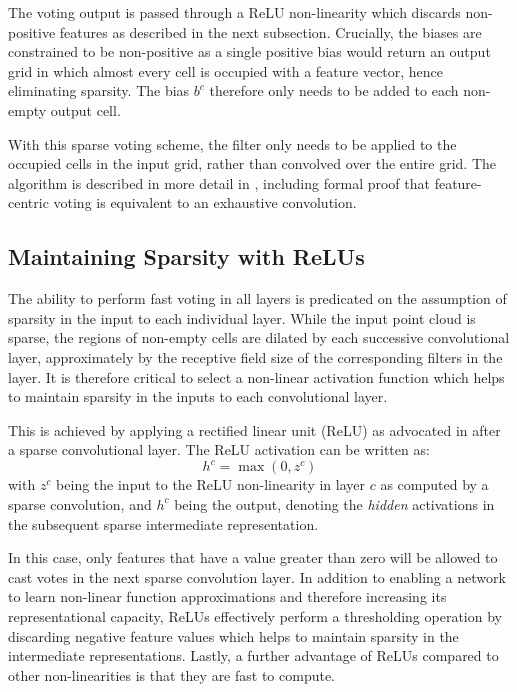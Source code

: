 \documentclass[letterpaper, 10 pt, conference]{tex_style/ieeeconf}
\begin{document}
The voting output is passed through a ReLU non-linearity which discards non-positive features as described in the next subsection.
Crucially, the biases are constrained to be non-positive as a single positive bias would return an output grid in which almost every cell is occupied with a feature vector, hence eliminating sparsity.
The bias $b^{c}$ therefore only needs to be added to each non-empty output cell.

With this sparse voting scheme, the filter only needs to be applied to the occupied cells in the input grid, rather than convolved over the entire grid.
The algorithm is described in more detail in \cite{wang2015voting}, including formal proof that feature-centric voting is equivalent to an exhaustive convolution.

\subsection{Maintaining Sparsity with ReLUs}
The ability to perform fast voting in all layers is predicated on the assumption of sparsity in the input to each individual layer.
While the input point cloud is sparse, the regions of non-empty cells are dilated by each successive convolutional layer, approximately by the receptive field size of the corresponding  filters in the layer.
It is therefore critical to select a non-linear activation function which helps to maintain sparsity in the inputs to each convolutional layer.

This is achieved by applying a rectified linear unit (ReLU) as advocated in \cite{glorot2011deep} after a sparse convolutional layer.
The ReLU activation can be written as:
 \begin{equation}
     h^{c} = \max \left(0, z^{c}\right)
 \end{equation}
 with $z^{c}$ being the input to the ReLU non-linearity in layer $c$ as computed by a sparse convolution, and $h^{c}$ being the output, denoting the \emph{hidden} activations in the subsequent sparse intermediate representation.

In this case, only features that have a value greater than zero will be allowed to cast votes in the next sparse convolution layer.
In addition to enabling a network to learn non-linear function approximations and therefore increasing its representational capacity, ReLUs effectively perform a thresholding operation by discarding negative feature values which helps to maintain sparsity in the intermediate representations.
Lastly, a further advantage of ReLUs compared to other non-linearities is that they are fast to compute.
 
\end{document}
